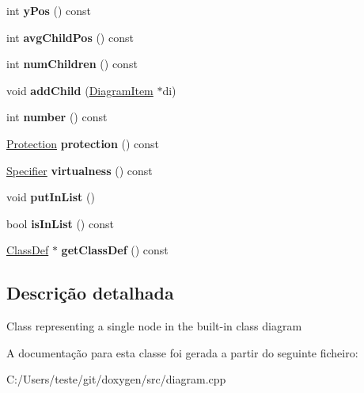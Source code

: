 \begin{DoxyCompactItemize}
\item 
\hypertarget{class_diagram_item_a028f1385610733ebccfb8010c1aae3c8}{int {\bfseries y\-Pos} () const }\label{class_diagram_item_a028f1385610733ebccfb8010c1aae3c8}

\item 
\hypertarget{class_diagram_item_a4079a2d7ddc27321a5a2cee907eb82e7}{int {\bfseries avg\-Child\-Pos} () const }\label{class_diagram_item_a4079a2d7ddc27321a5a2cee907eb82e7}

\item 
\hypertarget{class_diagram_item_a18aec3d8320c866509e3ba3b1dbed5a4}{int {\bfseries num\-Children} () const }\label{class_diagram_item_a18aec3d8320c866509e3ba3b1dbed5a4}

\item 
\hypertarget{class_diagram_item_a30ad97450ef5360beb14d4cc93b5fce1}{void {\bfseries add\-Child} (\hyperlink{class_diagram_item}{Diagram\-Item} $\ast$di)}\label{class_diagram_item_a30ad97450ef5360beb14d4cc93b5fce1}

\item 
\hypertarget{class_diagram_item_a45ddffab98cef97adf64bf713afd1a12}{int {\bfseries number} () const }\label{class_diagram_item_a45ddffab98cef97adf64bf713afd1a12}

\item 
\hypertarget{class_diagram_item_a149b66b75ad6cd6c17457a689e68cd9e}{\hyperlink{types_8h_a90e352184df58cd09455fe9996cd4ded}{Protection} {\bfseries protection} () const }\label{class_diagram_item_a149b66b75ad6cd6c17457a689e68cd9e}

\item 
\hypertarget{class_diagram_item_ac7df5a21fb382dc1a5cbc997f6575278}{\hyperlink{types_8h_ab16236bdd10ddf4d73a9847350f0017e}{Specifier} {\bfseries virtualness} () const }\label{class_diagram_item_ac7df5a21fb382dc1a5cbc997f6575278}

\item 
\hypertarget{class_diagram_item_a4e571251833d573e5f11f2b00391c22c}{void {\bfseries put\-In\-List} ()}\label{class_diagram_item_a4e571251833d573e5f11f2b00391c22c}

\item 
\hypertarget{class_diagram_item_abb220b76c0d4561e74c48953da7e579c}{bool {\bfseries is\-In\-List} () const }\label{class_diagram_item_abb220b76c0d4561e74c48953da7e579c}

\item 
\hypertarget{class_diagram_item_ad4dedf239d5d5a0b6b8c078f63fd81a2}{\hyperlink{class_class_def}{Class\-Def} $\ast$ {\bfseries get\-Class\-Def} () const }\label{class_diagram_item_ad4dedf239d5d5a0b6b8c078f63fd81a2}

\end{DoxyCompactItemize}


\subsection{Descrição detalhada}
Class representing a single node in the built-\/in class diagram 

A documentação para esta classe foi gerada a partir do seguinte ficheiro\-:\begin{DoxyCompactItemize}
\item 
C\-:/\-Users/teste/git/doxygen/src/diagram.\-cpp\end{DoxyCompactItemize}
